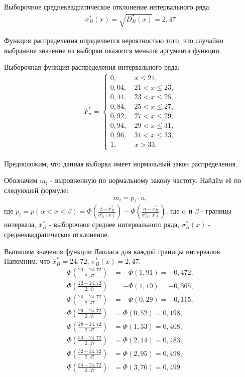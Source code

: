 \documentclass[utf8, a4paper, 14pt, russian, oneside]{book}
\begin{document}
Выборочное среднеквадратическое отклонение интервального ряда:
\begin{align*}
    \sigma_B^*(x) = \sqrt{D_B^*(x)} = 2,47
\end{align*}

Функция распределения определяется вероятностью того, что случайно выбранное значение из выборки окажется меньше аргумента функции.

Выборочная функция распределения интервального ряда:
\begin{align*}
    F_n^* =
    \begin{cases}
        0   ,&\ x \leq 21, \\
        0,04,&\  21 < x \leq 23, \\
        0,44,&\  23 < x \leq 25, \\
        0,84,&\  25 < x \leq 27, \\
        0,92,&\  27 < x \leq 29, \\
        0,94,&\  29 < x \leq 31, \\
        0,96,&\  31 < x \leq 33, \\
        1   ,&\  x > 33.
    \end{cases}
\end{align*}
\newpage

Предположим, что данная выборка имеет нормальный закон распределения.

Обозначим $m_i$ - выровненную по нормальному закону частоту. Найдём её по следующей формуле:
\begin{align*}
    m_i = p_i \cdot n,
\end{align*}
где $p_i = p(\alpha < x < \beta) = \Phi(\tfrac{\beta - \overline{x}_B^*}{\sigma_B^*(x)}) - \Phi(\tfrac{\alpha - \overline{x}_B^*}{\sigma_B^*(x)})$, где
$\alpha$ и $\beta$ - границы интервала, $\overline{x}_B^*$ - выборочное среднее интервального ряда, $\sigma_B^*(x)$ - среднеквадратическое отклонение.

Выпишем значения функции Лапласа для каждой границы интервалов. Напомним, что $\overline{x}_B^* = 24,72$, $\sigma_B^*(x) = 2,47$.
\begin{align*}
    \Phi \left( \frac{20 - 24,72}{2,47} \right) &= -\Phi(1,91) = -0,472,\\
    \Phi \left( \frac{22 - 24,72}{2,47} \right) &= -\Phi(1,10) = -0,365,\\
    \Phi \left( \frac{24 - 24,72}{2,47} \right) &= -\Phi(0,29) = -0,115,\\
    \Phi \left( \frac{26 - 24,72}{2,47} \right) &=  \Phi(0,52) =  0,198,\\
    \Phi \left( \frac{28 - 24,72}{2,47} \right) &=  \Phi(1,33) =  0,408,\\
    \Phi \left( \frac{30 - 24,72}{2,47} \right) &=  \Phi(2,14) =  0,483,\\
    \Phi \left( \frac{32 - 24,72}{2,47} \right) &=  \Phi(2,95) =  0,498,\\
    \Phi \left( \frac{34 - 24,72}{2,47} \right) &=  \Phi(3,76) =  0,499.
\end{align*}
\end{document}
